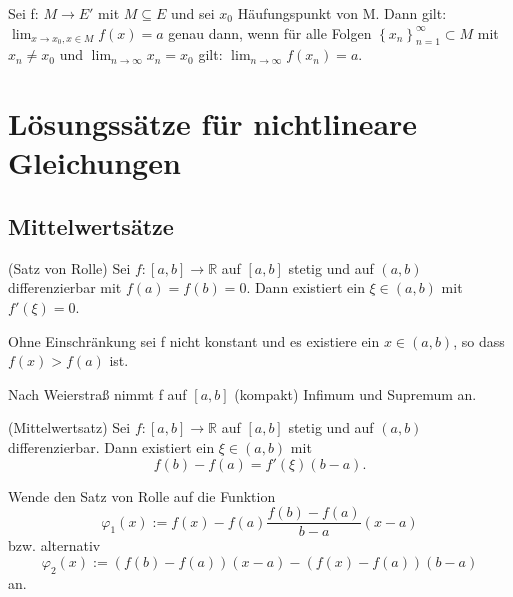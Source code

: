 \documentclass[10pt]{scrbook}
\begin{document}
\begin{Sa}
Sei f: $M\rightarrow E'$ mit $M\subseteq E$ und sei $x_0$ Häufungspunkt von M. Dann gilt: $\lim_{x\rightarrow x_0, x\in M} f(x)=a$ genau dann, wenn für alle Folgen $\left\{x_n\right\}_{n=1}^\infty\subset M$ mit $x_n\neq x_0$ und $\lim_{n\rightarrow \infty} x_n=x_0$ gilt: $\lim_{n\rightarrow \infty} f(x_n)=a$.
\end{Sa}

\section{Lösungssätze für nichtlineare Gleichungen}

\subsection{Mittelwertsätze}

\begin{Sa} (Satz von Rolle)
Sei $f: [a, b] \rightarrow \mathbb{R}$ auf $[a, b]$ stetig und auf $(a, b)$ differenzierbar mit $f(a)=f(b)=0$.
Dann existiert ein $\xi\in (a, b)$ mit $f'(\xi)=0$.
\end{Sa}
\begin{bew}
Ohne Einschränkung sei f nicht konstant und es existiere ein $x\in(a, b)$, so dass $f(x)>f(a)$ ist.

Nach Weierstraß nimmt f auf $[a, b]$ (kompakt) Infimum und Supremum an. 
\end{bew}

\begin{Sa} (Mittelwertsatz)
Sei $f: [a, b] \rightarrow \mathbb{R}$ auf $[a, b]$ stetig und auf $(a, b)$ differenzierbar. Dann existiert ein $\xi\in (a, b)$ mit
\begin{equation}
f\left(b\right)-f\left(a\right) = f'\left(\xi\right) \left(b-a\right).
\end{equation}
\end{Sa}

\begin{bew}
Wende den Satz von Rolle auf die Funktion
\begin{displaymath}
\varphi_1(x) := f(x)-f(a) \frac{f\left(b\right)-f\left(a\right)}{b-a} \left(x-a\right)
\end{displaymath}
bzw. alternativ
\begin{displaymath}
\varphi_2(x) := \left(f\left(b\right)-f\left(a\right)\right) \left(x-a\right)-\left(f\left(x\right)-f\left(a\right)\right) \left(b-a\right)
\end{displaymath}
an.
\end{bew}
\end{document}
